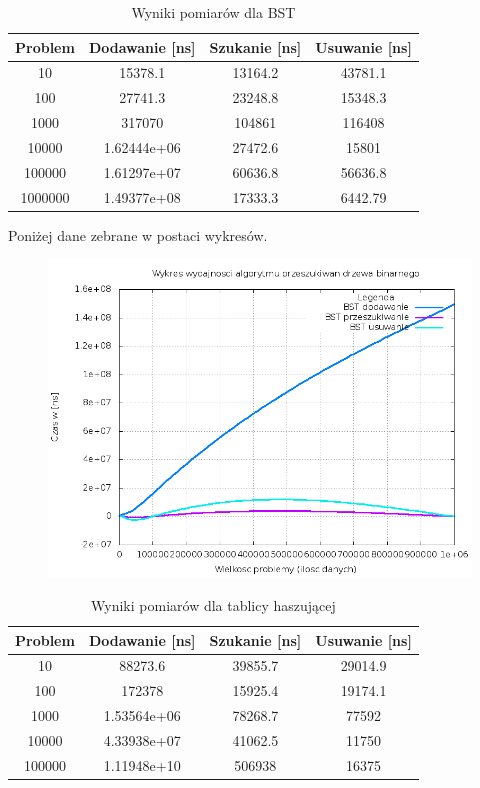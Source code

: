 \documentclass[a4paper,12pt]{article}
\begin{document}
\begin{table}[ht] 
\caption{Wyniki pomiarów dla BST} 
\centering 
\begin{tabular}{|c|c|c|c|}

\hline
\hline
Problem & Dodawanie [ns] & Szukanie [ns] & Usuwanie [ns]\\
\hline
10 & 15378.1 & 13164.2 & 43781.1 \\
\hline
100 & 27741.3 & 23248.8 & 15348.3 \\
\hline
1000 & 317070 & 104861 & 116408 \\
\hline
10000 & 1.62444e+06 & 27472.6 & 15801 \\
\hline
100000 & 1.61297e+07 & 60636.8 & 56636.8 \\
\hline
1000000 & 1.49377e+08 & 17333.3 & 6442.79 \\
\hline \hline

\end{tabular}
\end{table}

Poniżej dane zebrane w postaci wykresów.

\begin{center}
	\begin{figure}[h]
		\includegraphics[scale = 0.4]{BST_result.png}
	\end{figure}
\end{center}

\newpage

\begin{table}[ht] 
\caption{Wyniki pomiarów dla tablicy haszującej} 
\centering 
\begin{tabular}{|c|c|c|c|}

\hline
\hline
Problem & Dodawanie [ns] & Szukanie [ns] & Usuwanie [ns]\\
\hline
10 & 88273.6 & 39855.7 & 29014.9 \\
\hline
100 & 172378 & 15925.4 & 19174.1 \\
\hline
1000 & 1.53564e+06 & 78268.7 & 77592 \\
\hline
10000 & 4.33938e+07 & 41062.5 & 11750 \\
\hline
100000 & 1.11948e+10 & 506938 & 16375 \\
\hline \hline

\end{tabular}
\end{table}
\end{document}
